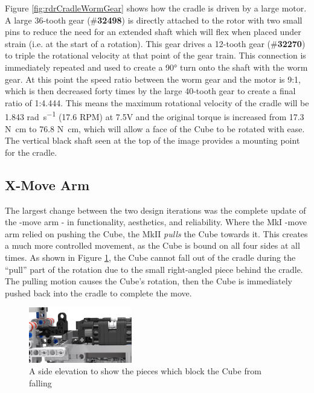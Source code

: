 \documentclass{report}
\newcommand{\tbo}[1]{\textbf{#1}}
\newcommand{\tit}[1]{\textit{#1}}
\newcommand{\legopiece}[1]{(\#\tbo{#1})}
\newcommand{\move}[1]{\uppercase{\texttt{\formatmovesnospace{#1}}}-move}
\begin{document}
	Figure \ref{fig:rdrCradleWormGear} shows how the cradle is driven by a large motor. A large 36-tooth gear \legopiece{32498} is directly attached to the rotor with two small pins to reduce the need for an extended shaft which will flex when placed under strain (i.e. at the start of a rotation). This gear drives a 12-tooth gear \legopiece{32270} to triple the rotational velocity at that point of the gear train. This connection is immediately repeated and used to create a \ang{90} turn onto the shaft with the worm gear. At this point the speed ratio between the worm gear and the motor is 9:1, which is then decreased forty times by the large 40-tooth gear to create a final ratio of 1:4.444. This means the maximum rotational velocity of the cradle will be 1.843 \si{\radian\per\second} (17.6 RPM) at 7.5\si{\volt} and the original torque is increased from 17.3 \si{\newton\centi\metre} to 76.8 \si{\newton\centi\metre}, which will allow a face of the Cube to be rotated with ease. The vertical black shaft seen at the top of the image provides a mounting point for the cradle.
	
	\subsection{X-Move Arm}
    
    The largest change between the two design iterations was the complete update of the \move{x} arm - in functionality, aesthetics, and reliability. Where the MkI \move{x} arm relied on pushing the Cube, the MkII \tit{pulls} the Cube towards it. This creates a much more controlled movement, as the Cube is bound on all four sides at all times. As shown in Figure \ref{fig:rdrXMoveBlock}, the Cube cannot fall out of the cradle during the \enquote{pull} part of the rotation due to the small right-angled piece behind the cradle. The pulling motion causes the Cube's rotation, then the Cube is immediately pushed back into the cradle to complete the move.
   	
	\begin{figure}[H]
   		\begin{center}
   			\includegraphics[width=0.4\textwidth]{Resources/Images/rdrXMoveBlock.png}
   			\caption{A side elevation to show the pieces which block the Cube from falling}
   			\label{fig:rdrXMoveBlock}
   		\end{center} 
   	\end{figure}
   
\end{document}
